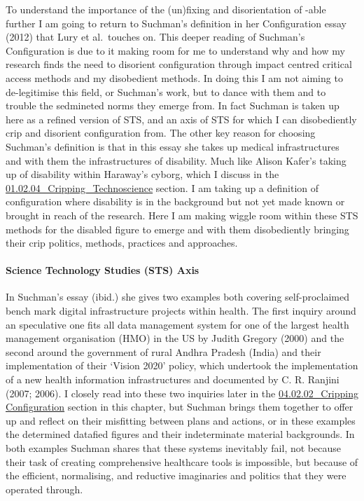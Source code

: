 To understand the importance of the (un)fixing and disorientation of
-able further I am going to return to Suchman's definition in her
Configuration essay (2012) that Lury et al.~touches on. This deeper
reading of Suchman's Configuration is due to it making room for me to
understand why and how my research finds the need to disorient
configuration through impact centred critical access methods and my
disobedient methods. In doing this I am not aiming to de-legitimise this
field, or Suchman's work, but to dance with them and to trouble the
sedmineted norms they emerge from. In fact Suchman is taken up here as a
refined version of STS, and an axis of STS for which I can disobediently
crip and disorient configuration from. The other key reason for choosing
Suchman's definition is that in this essay she takes up medical
infrastructures and with them the infrastructures of disability. Much
like Alison Kafer's taking up of disability within Haraway's cyborg,
which I discuss in the
\href{../../01_Disability_justice_and_life_affirmation_flipping_the_table/sections/01.02.04_Cripping_Technoscience.md}{01.02.04\_Cripping\_Technoscience}
section. I am taking up a definition of configuration where disability
is in the background but not yet made known or brought in reach of the
research. Here I am making wiggle room within these STS methods for the
disabled figure to emerge and with them disobediently bringing their
crip politics, methods, practices and approaches.

\hypertarget{science-technology-studies-sts-axis}{%
\paragraph[Science Technology Studies (STS)
Axis]{\texorpdfstring{\protect\hypertarget{anchor}{}{}Science Technology
Studies (STS)
Axis}{Science Technology Studies (STS) Axis}}\label{science-technology-studies-sts-axis}}

In Suchman's essay (ibid.) she gives two examples both covering
self-proclaimed bench mark digital infrastructure projects within
health. The first inquiry around an speculative one fits all data
management system for one of the largest health management organisation
(HMO) in the US by Judith Gregory (2000) and the second around the
government of rural Andhra Pradesh (India) and their implementation of
their `Vision 2020' policy, which undertook the implementation of a new
health information infrastructures and documented by C. R. Ranjini
(2007; 2006). I closely read into these two inquiries later in the
\href{04.02.02_Cripping\%20Configuration.md}{04.02.02\_Cripping
Configuration} section in this chapter, but Suchman brings them together
to offer up and reflect on their misfitting between plans and actions,
or in these examples the determined datafied figures and their
indeterminate material backgrounds. In both examples Suchman shares that
these systems inevitably fail, not because their task of creating
comprehensive healthcare tools is impossible, but because of the
efficient, normalising, and reductive imaginaries and politics that they
were operated through.

